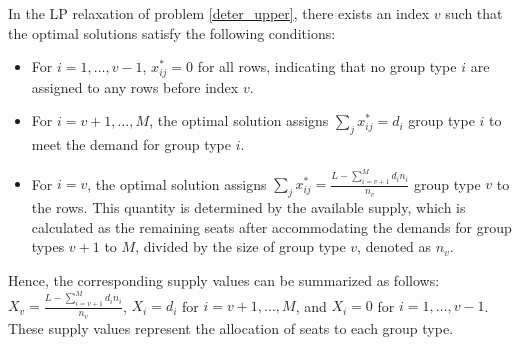 \begin{prop}\label{sol_relax_deter}
In the LP relaxation of problem \eqref{deter_upper}, there exists an index $v$ such that the optimal solutions satisfy the following conditions:

\begin{itemize}
\item For $i = 1,\ldots, v-1$, $x_{ij}^{*} = 0$ for all rows, indicating that no group type $i$ are assigned to any rows before index $v$.
\item For $i = v+1,\ldots, M$, the optimal solution assigns $\sum_{j} x_{ij}^{*} = d_{i}$ group type $i$ to meet the demand for group type $i$.
\item For $i = v$, the optimal solution assigns $\sum_{j} x_{ij}^{*} = \frac{L - \sum_{i = v+1}^{M} {d_i n_i}}{n_v}$ group type $v$ to the rows. This quantity is determined by the available supply, which is calculated as the remaining seats after accommodating the demands for group types $v+1$ to $M$, divided by the size of group type $v$, denoted as $n_v$.
\end{itemize}

Hence, the corresponding supply values can be summarized as follows: $X_v = \frac{L - \sum_{i = v+1}^{M} {d_i n_i}}{n_v}$, $X_{i} = d_{i}$ for $i = v+1,\ldots, M$, and $X_{i} = 0$ for $i = 1, \ldots, v-1$. These supply values represent the allocation of seats to each group type.
\end{prop}